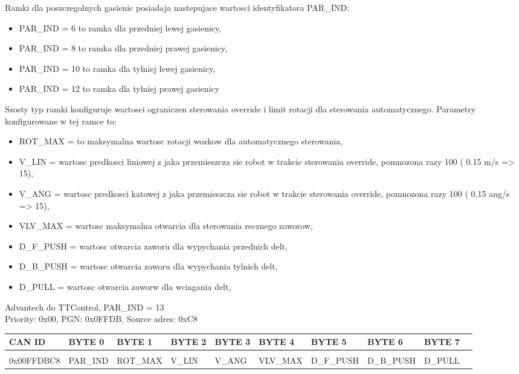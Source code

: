 \documentclass{article}
\begin{document}
Ramki dla poszczegolnych gasienic posiadaja nastepujace wartosci identyfikatora PAR\_IND: 
\begin{itemize}
    \item PAR\_IND  = 6 to ramka dla przedniej lewej gasienicy,
    \item PAR\_IND  = 8 to ramka dla przedniej prawej gasienicy,
    \item PAR\_IND  = 10 to ramka dla tylniej lewej gasienicy,
    \item PAR\_IND  = 12 to ramka dla tylniej prawej gasienicy
\end{itemize}

Szosty typ ramki konfiguruje wartosci ograniczen sterowania override i limit rotacji dla sterowania automatycznego. Parametry konfigurowane w tej ramce to:
\begin{itemize}
    \item ROT\_MAX = to maksymalna wartosc rotacji wozkow dla automatycznego sterowania,
    \item V\_LIN = wartosc predkosci liniowej z jaka przemieszcza sie robot w trakcie sterowania override, pomnozona razy 100 ( 0.15 m/s => 15),
    \item V\_ANG = wartosc predkosci katowej z jaka przemieszcza sie robot w trakcie sterowania override, pomnozona razy 100 ( 0.15 ang/s => 15),
    \item VLV\_MAX = wartosc maksymalna otwarcia dla sterowania recznego zaworow,
    \item D\_F\_PUSH = wartosc otwarcia zaworu dla wypychania przednich delt,
    \item D\_B\_PUSH = wartosc otwarcia zaworu dla wypychania tylnich delt,
    \item D\_PULL = wartosc otwarcia zaworw dla wciagania delt,
\end{itemize}

Advantech do TTControl, PAR\_IND  = 13\\
Priority: 0x00, PGN: 0x0FFDB, Source adres: 0xC8 \\
\begin{left}
\begin{tabular}{ |p{2cm}|p{1.35cm}|p{1.5cm}|p{1.15cm}|p{1.15cm}|p{1.5cm}|p{1.6cm}|p{1.6cm}|p{1.2cm}|p{1.35cm}|} 
 \hline
 CAN ID & BYTE 0 & BYTE 1 & BYTE 2 & BYTE 3 & BYTE 4 & BYTE 5 & BYTE 6 & BYTE 7 \\ \hline
 & & & & & & & &\\
0x00FFDBC8 & PAR\_IND & ROT\_MAX & V\_LIN & V\_ANG & VLV\_MAX & D\_F\_PUSH & D\_B\_PUSH & D\_PULL\\
 \hline
\end{tabular}
\end{left}\\
\end{document}
